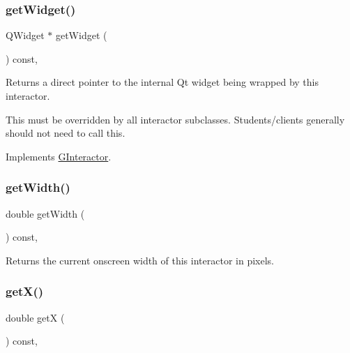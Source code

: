\subsubsection{\texorpdfstring{get\+Widget()}{getWidget()}}
{\footnotesize\ttfamily Q\+Widget $\ast$ get\+Widget (\begin{DoxyParamCaption}{ }\end{DoxyParamCaption}) const\hspace{0.3cm}{\ttfamily [override]}, {\ttfamily [virtual]}}



Returns a direct pointer to the internal Qt widget being wrapped by this interactor. 

This must be overridden by all interactor subclasses. Students/clients generally should not need to call this. 

Implements \mbox{\hyperlink{classGInteractor}{G\+Interactor}}.

\mbox{\label{classGInteractor_a0ed2965abd4f5701d2cadf71239faf19}} 
\subsubsection{\texorpdfstring{get\+Width()}{getWidth()}}
{\footnotesize\ttfamily double get\+Width (\begin{DoxyParamCaption}{ }\end{DoxyParamCaption}) const\hspace{0.3cm}{\ttfamily [virtual]}, {\ttfamily [inherited]}}



Returns the current onscreen width of this interactor in pixels. 

\mbox{\label{classGInteractor_a344385751bee0720059403940d57a13e}} 
\subsubsection{\texorpdfstring{get\+X()}{getX()}}
{\footnotesize\ttfamily double getX (\begin{DoxyParamCaption}{ }\end{DoxyParamCaption}) const\hspace{0.3cm}{\ttfamily [virtual]}, {\ttfamily [inherited]}}



